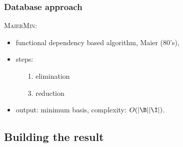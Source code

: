 \begin{frame}
\frametitle{Database approach}

\textsc{MaierMin}:
\begin{itemize}
	\item functional dependency based algorithm, Maier (80's),
	
	\item steps:
		\begin{itemize}
			\item[\color{belize} 1.]  elimination
			\item[ ] 
			
			\vspace{0.5em}
			
			\item[\color{belize} 3.]  reduction
			\item[ ] 
			\item[ ] 
		\end{itemize}

	\item output: minimum basis, complexity: $O(|\B||\I|)$.
\end{itemize}

\end{frame}

\subsection{Building the result}

